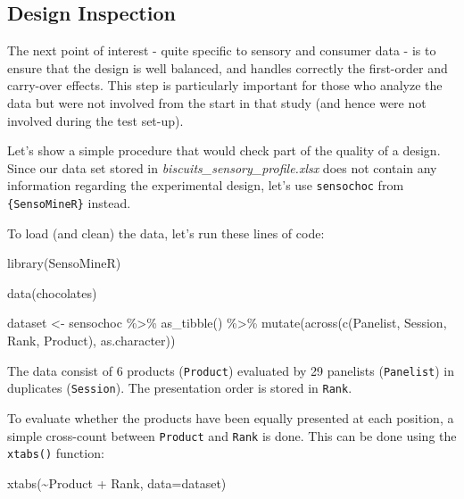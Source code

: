 \documentclass[
]{krantz}
\makeatletter
\newenvironment{Shaded}{\begin{snugshade}}{\end{snugshade}}
\newcommand{\AttributeTok}[1]{\textcolor[rgb]{0.61,0.61,0.61}{#1}}
\newcommand{\FunctionTok}[1]{\textcolor[rgb]{0,0,0}{#1}}
\newcommand{\NormalTok}[1]{#1}
\newcommand{\OtherTok}[1]{\textcolor[rgb]{0.37,0.37,0.37}{#1}}
\newcommand{\SpecialCharTok}[1]{\textcolor[rgb]{0,0,0}{#1}}
\newenvironment{kframe}{%
\medskip{}
\setlength{\fboxsep}{.8em}
 \def\at@end@of@kframe{}%
 \ifinner\ifhmode%
  \def\at@end@of@kframe{\end{minipage}}%
  \begin{minipage}{\columnwidth}%
 \fi\fi%
 \def\FrameCommand##1{\hskip\@totalleftmargin \hskip-\fboxsep
 \colorbox{shadecolor}{##1}\hskip-\fboxsep
     \hskip-\linewidth \hskip-\@totalleftmargin \hskip\columnwidth}%
 \MakeFramed {\advance\hsize-\width
   \@totalleftmargin\z@ \linewidth\hsize
   \@setminipage}}%
 {\par\unskip\endMakeFramed%
 \at@end@of@kframe}
\renewenvironment{Shaded}{\begin{kframe}}{\end{kframe}}
\makeatother
\begin{document}
\hypertarget{design-inspection}{%
\subsection{Design Inspection}\label{design-inspection}}

The next point of interest - quite specific to sensory and consumer data - is to ensure that the design is well balanced, and handles correctly the first-order and carry-over effects. This step is particularly important for those who analyze the data but were not involved from the start in that study (and hence were not involved during the test set-up).

Let's show a simple procedure that would check part of the quality of a design. Since our data set stored in \emph{biscuits\_sensory\_profile.xlsx} does not contain any information regarding the experimental design, let's use \texttt{sensochoc} from \texttt{\{SensoMineR\}} instead.

To load (and clean) the data, let's run these lines of code:

\begin{Shaded}
\begin{Highlighting}[]
\FunctionTok{library}\NormalTok{(SensoMineR)}

\FunctionTok{data}\NormalTok{(chocolates)}

\NormalTok{dataset }\OtherTok{\textless{}{-}}\NormalTok{ sensochoc }\SpecialCharTok{\%\textgreater{}\%} 
  \FunctionTok{as\_tibble}\NormalTok{() }\SpecialCharTok{\%\textgreater{}\%} 
  \FunctionTok{mutate}\NormalTok{(}\FunctionTok{across}\NormalTok{(}\FunctionTok{c}\NormalTok{(Panelist, Session, Rank, Product), as.character))}
\end{Highlighting}
\end{Shaded}

The data consist of 6 products (\texttt{Product}) evaluated by 29 panelists (\texttt{Panelist}) in duplicates (\texttt{Session}). The presentation order is stored in \texttt{Rank}.

To evaluate whether the products have been equally presented at each position, a simple cross-count between \texttt{Product} and \texttt{Rank} is done. This can be done using the \texttt{xtabs()} function:

\begin{Shaded}
\begin{Highlighting}[]
\FunctionTok{xtabs}\NormalTok{(}\SpecialCharTok{\textasciitilde{}}\NormalTok{Product }\SpecialCharTok{+}\NormalTok{ Rank, }\AttributeTok{data=}\NormalTok{dataset)}
\end{Highlighting}
\end{Shaded}
\end{document}
